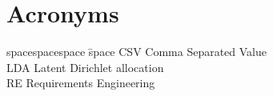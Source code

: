 \section*{Acronyms}

\begin{tabbing}
spacespacespace \= space \kill
CSV \> Comma Separated Value \\
LDA	\>	Latent Dirichlet allocation \\
RE	\>	Requirements Engineering \\
\end{tabbing}
